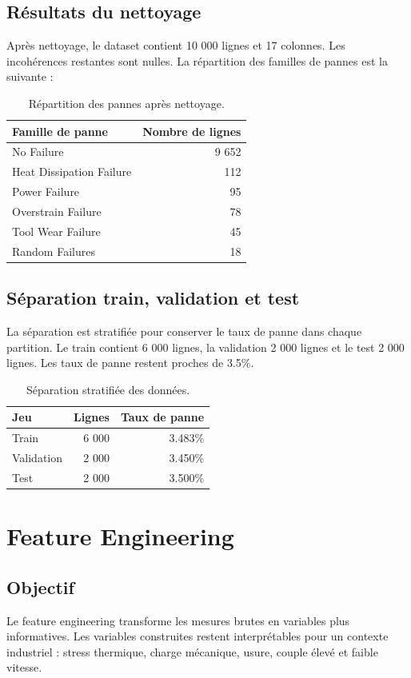 \documentclass[12pt,a4paper]{report}
\begin{document}
\section{Résultats du nettoyage}
Après nettoyage, le dataset contient 10 000 lignes et 17 colonnes. Les incohérences restantes sont nulles. La répartition des familles de pannes est la suivante :

\begin{table}[H]
\centering
\begin{tabular}{lr}
\toprule
\textbf{Famille de panne} & \textbf{Nombre de lignes} \\
\midrule
No Failure & 9 652 \\
Heat Dissipation Failure & 112 \\
Power Failure & 95 \\
Overstrain Failure & 78 \\
Tool Wear Failure & 45 \\
Random Failures & 18 \\
\bottomrule
\end{tabular}
\caption{Répartition des pannes après nettoyage.}
\end{table}

\section{Séparation train, validation et test}
La séparation est stratifiée pour conserver le taux de panne dans chaque partition. Le train contient 6 000 lignes, la validation 2 000 lignes et le test 2 000 lignes. Les taux de panne restent proches de 3.5\%.

\begin{table}[H]
\centering
\begin{tabular}{lrr}
\toprule
\textbf{Jeu} & \textbf{Lignes} & \textbf{Taux de panne} \\
\midrule
Train & 6 000 & 3.483\% \\
Validation & 2 000 & 3.450\% \\
Test & 2 000 & 3.500\% \\
\bottomrule
\end{tabular}
\caption{Séparation stratifiée des données.}
\end{table}

\chapter{Feature Engineering}

\section{Objectif}
Le feature engineering transforme les mesures brutes en variables plus informatives. Les variables construites restent interprétables pour un contexte industriel : stress thermique, charge mécanique, usure, couple élevé et faible vitesse.
\end{document}

